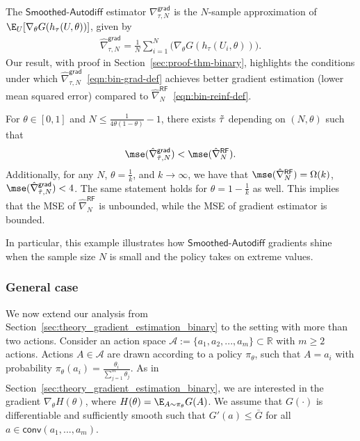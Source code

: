 \noindent The $\mathsf{Smoothed\text{-}Autodiff}$ estimator $\nabla_{\tau,N}^{\mathsf{grad}}$ is the $N$-sample approximation of 
$\E_{U}[\nabla_\theta G(h_{\tau}(U,\theta))]$, 
 given by
\begin{align}
    \hat{\nabla}^{\mathsf{grad}}_{\tau,N} = \frac{1}{N}\sum_{i=1}^N\Big(\nabla_\theta{G}(h_\tau(U_i,\theta))\Big).
    \label{eqn:bin-grad-def}
\end{align}
 Our result, with proof in Section~\ref{sec:proof-thm-binary},
 highlights the conditions under which 
 $\hat{\nabla}^{\mathsf{grad}}_{\tau,N}$~\eqref{eqn:bin-grad-def} achieves better gradient estimation (lower mean squared error)  compared to $\hat{\nabla}^{\mathsf{RF}}_{N}$~\eqref{eqn:bin-reinf-def}.
\begin{theorem}
For $\theta \in [0,1]$ and $N \le  \frac{1}{4\theta(1-\theta)} - 1$,
there exists $\Tilde{\tau}$ depending on $(N, \theta)$ such that 
\begin{align*}
\mse(\hat{\nabla}^{\mathsf{grad}}_{\Tilde{\tau},N})
< 
\mse(\hat{\nabla}^{\mathsf{RF}}_{N}).
\end{align*}
Additionally, for any $N$, $\theta = \frac{1}{k}$, and $k \to \infty$, we have that
$\mse(\hat{\nabla}^{\mathsf{RF}}_{N})  = \Omega(k) 
$, $\mse(\hat{\nabla}^{\mathsf{grad}}_{\tilde{\tau},N}) < 4$. 
The same statement holds for $\theta =  1-\frac{1}{k}$ as well. 
This implies that the MSE of $\hat{\nabla}^{\mathsf{RF}}_{N}$ is unbounded, while the MSE of gradient estimator is bounded.
\label{thm:binary}
\end{theorem}
\noindent In particular, this example illustrates how $\mathsf{Smoothed\text{-}Autodiff}$ gradients shine when 
the sample size $N$ is small and the policy takes on extreme values.

\subsubsection{General case}
\label{sec:theory_gradient_estimation_multi}

We now extend our analysis from Section~\ref{sec:theory_gradient_estimation_binary} to the setting with more than two actions.
Consider an  action space  $\mathcal{A}:= \{a_1,a_2,...,a_m\} \subset \mathbb{R}$ with $m \ge 2$ actions. 
Actions $A\in \mathcal{A}$ are drawn according to a policy $\pi_\theta$, such that $A=a_i$ with probability $\pi_\theta(a_i) = \frac{\theta_i}{\sum_{j=1}^m \theta_j}$. 
As in Section~\ref{sec:theory_gradient_estimation_binary}, we are interested in the gradient $\nabla_\theta H(\theta)$, where $H(\theta) =\E_{A\sim \pi_\theta}G(A)$. We assume that 
$G(\cdot)$ is differentiable and  sufficiently smooth such that
$G'(a) \le \bar{G}$ for all $a \in \mathsf{conv}(a_1,...,a_m)$. 

